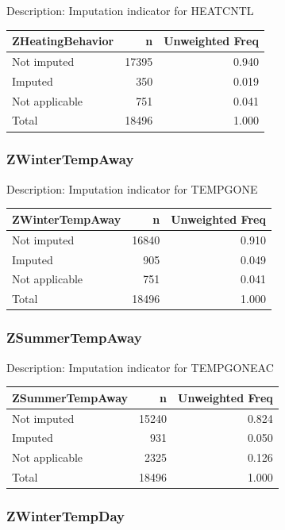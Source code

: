 \documentclass[
]{krantz}
\begin{document}
Description: Imputation indicator for HEATCNTL

\begin{tabular}[t]{l|r|r}
\hline
ZHeatingBehavior & n & Unweighted Freq\\
\hline
Not imputed & 17395 & 0.940\\
\hline
Imputed & 350 & 0.019\\
\hline
Not applicable & 751 & 0.041\\
\hline
Total & 18496 & 1.000\\
\hline
\end{tabular}

\hypertarget{zwintertempaway}{%
\subsubsection*{ZWinterTempAway}\label{zwintertempaway}}


Description: Imputation indicator for TEMPGONE

\begin{tabular}[t]{l|r|r}
\hline
ZWinterTempAway & n & Unweighted Freq\\
\hline
Not imputed & 16840 & 0.910\\
\hline
Imputed & 905 & 0.049\\
\hline
Not applicable & 751 & 0.041\\
\hline
Total & 18496 & 1.000\\
\hline
\end{tabular}

\hypertarget{zsummertempaway}{%
\subsubsection*{ZSummerTempAway}\label{zsummertempaway}}


Description: Imputation indicator for TEMPGONEAC

\begin{tabular}[t]{l|r|r}
\hline
ZSummerTempAway & n & Unweighted Freq\\
\hline
Not imputed & 15240 & 0.824\\
\hline
Imputed & 931 & 0.050\\
\hline
Not applicable & 2325 & 0.126\\
\hline
Total & 18496 & 1.000\\
\hline
\end{tabular}

\hypertarget{zwintertempday}{%
\subsubsection*{ZWinterTempDay}\label{zwintertempday}}
\end{document}
